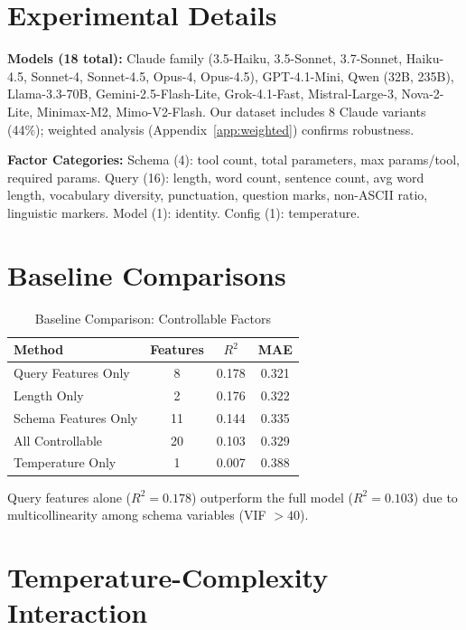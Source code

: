 \documentclass[sigconf,anonymous,review]{acmart}
\begin{document}
\section{Experimental Details}
\label{app:experimental_details}

\textbf{Models (18 total):} Claude family (3.5-Haiku, 3.5-Sonnet, 3.7-Sonnet, Haiku-4.5, Sonnet-4, Sonnet-4.5, Opus-4, Opus-4.5), GPT-4.1-Mini, Qwen (32B, 235B), Llama-3.3-70B, Gemini-2.5-Flash-Lite, Grok-4.1-Fast, Mistral-Large-3, Nova-2-Lite, Minimax-M2, Mimo-V2-Flash. Our dataset includes 8 Claude variants (44\%); weighted analysis (Appendix~\ref{app:weighted}) confirms robustness.

\textbf{Factor Categories:} Schema (4): tool count, total parameters, max params/tool, required params. Query (16): length, word count, sentence count, avg word length, vocabulary diversity, punctuation, question marks, non-ASCII ratio, linguistic markers. Model (1): identity. Config (1): temperature.

\section{Baseline Comparisons}
\label{app:baselines}

\begin{table}[h]
\centering
\caption{Baseline Comparison: Controllable Factors}
\small
\begin{tabular}{@{}lccc@{}}
\toprule
\textbf{Method} & \textbf{Features} & \textbf{$R^2$} & \textbf{MAE} \\
\midrule
Query Features Only & 8 & 0.178 & 0.321 \\
Length Only & 2 & 0.176 & 0.322 \\
Schema Features Only & 11 & 0.144 & 0.335 \\
All Controllable & 20 & 0.103 & 0.329 \\
Temperature Only & 1 & 0.007 & 0.388 \\
\bottomrule
\end{tabular}
\end{table}

Query features alone ($R^2=0.178$) outperform the full model ($R^2=0.103$) due to multicollinearity among schema variables (VIF $>40$).

\section{Temperature-Complexity Interaction}
\label{app:interaction}
\end{document}
